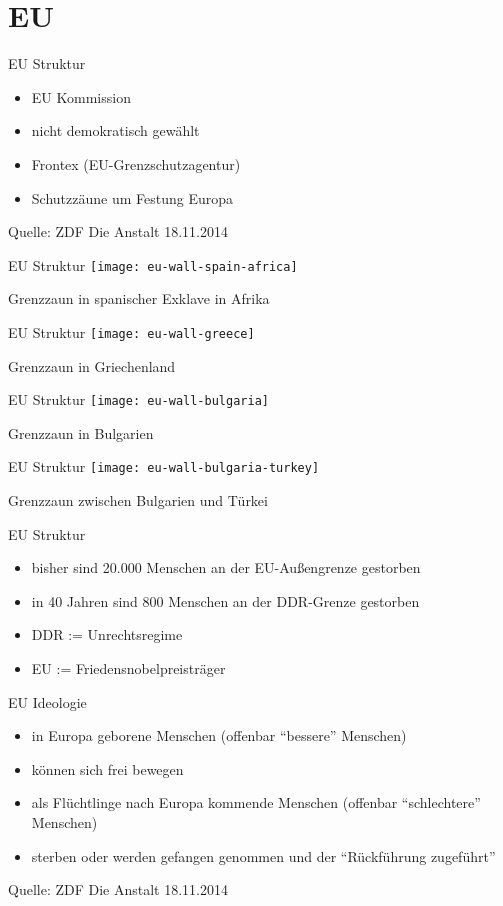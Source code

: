 \documentclass{beamer}
\begin{document}
	\section{EU}
	\begin{frame}{EU Struktur}
		\begin{itemize}
			\item EU Kommission
			\item nicht demokratisch gewählt
			\item Frontex (EU-Grenzschutzagentur)
			\item Schutzzäune um Festung Europa
		\end{itemize}
		
		Quelle: ZDF Die Anstalt 18.11.2014
	\end{frame}
	\begin{frame}{EU Struktur}
		\centering
		\texttt{[image: eu-wall-spain-africa]}
		
		Grenzzaun in spanischer Exklave in Afrika
	\end{frame}
	\begin{frame}{EU Struktur}
		\centering
		\texttt{[image: eu-wall-greece]}
		
		Grenzzaun in Griechenland
	\end{frame}
	\begin{frame}{EU Struktur}
		\centering
		\texttt{[image: eu-wall-bulgaria]}
		
		Grenzzaun in Bulgarien
	\end{frame}
	\begin{frame}{EU Struktur}
		\centering
		\texttt{[image: eu-wall-bulgaria-turkey]}
		
		Grenzzaun zwischen Bulgarien und Türkei
	\end{frame}
	\begin{frame}{EU Struktur}
		\begin{itemize}
			\item bisher sind 20.000 Menschen an der EU-Außengrenze gestorben
			\item in 40 Jahren sind 800 Menschen an der DDR-Grenze gestorben
			\item<2-> DDR := Unrechtsregime
			\item<3-> EU := Friedensnobelpreisträger
		\end{itemize}
	\end{frame}
	\begin{frame}{EU Ideologie}
		\begin{itemize}
			\item in Europa geborene Menschen (offenbar "`bessere"' Menschen)
			\item können sich frei bewegen
			\item als Flüchtlinge nach Europa kommende Menschen (offenbar "`schlechtere"' Menschen)
			\item sterben oder werden gefangen genommen und der "`Rückführung zugeführt"'
		\end{itemize}
		
		Quelle: ZDF Die Anstalt 18.11.2014
	\end{frame}
	
\end{document}
